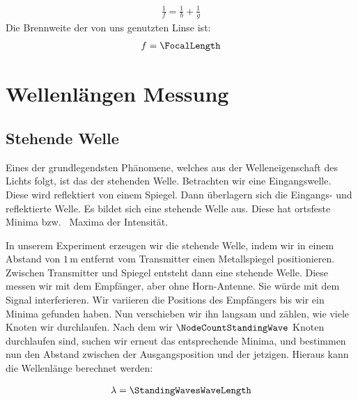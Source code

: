 \documentclass[a4paper,10pt,twocolumn]{article}
\begin{document}
    \begin{align}
        \label{eq:LensFormula}
        \frac{1}{f} = \frac{1}{b} + \frac{1}{g}
    \end{align}
    Die Brennweite der von uns genutzten Linse ist:
    \begin{align*}
        f = \FocalLength
    \end{align*}
    
    \section{Wellenlängen Messung}
    \subsection{Stehende Welle}
    
    Eines der grundlegendsten Phänomene, welches aus der Welleneigenschaft des Lichts folgt, ist das der stehenden Welle.
    Betrachten wir eine Eingangswelle.
    Diese wird reflektiert von einem Spiegel.
    Dann überlagern sich die Eingangs- und reflektierte Welle.
    Es bildet sich eine stehende Welle aus.
    Diese hat ortsfeste Minima bzw. \ Maxima der Intensität.
    
    In unserem Experiment erzeugen wir die stehende Welle, indem wir in einem Abstand von $1\, \mathrm{m}$ entfernt
    vom Transmitter einen Metallspiegel positionieren.
    Zwischen Transmitter und Spiegel entsteht dann eine stehende Welle.
    Diese messen wir mit dem Empfänger, aber ohne Horn-Antenne.
    Sie würde mit dem Signal interferieren.
    Wir variieren die Positions des Empfängers bis wir ein Minima gefunden haben.
    Nun verschieben wir ihn langsam und zählen, wie viele Knoten wir durchlaufen.
    Nach dem wir $\NodeCountStandingWave$ Knoten durchlaufen sind, suchen wir erneut das entsprechende Minima, und 
    bestimmen nun den Abstand zwischen der Ausgangsposition und der jetzigen. 
    Hieraus kann die Wellenlänge berechnet werden:
    
    \begin{align*}
        \lambda = \StandingWavesWaveLength
    \end{align*}
    
\end{document}
